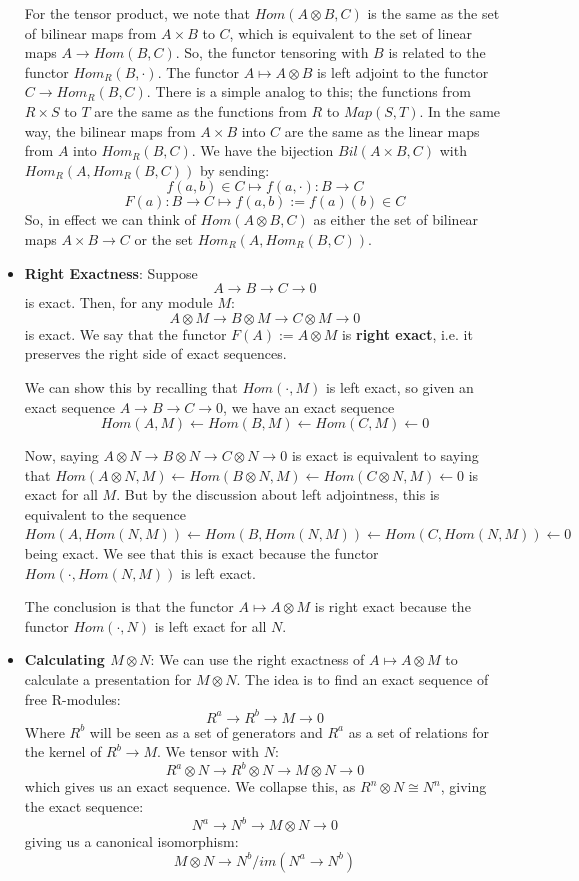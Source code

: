 \documentclass[11pt, oneside]{amsart}   	%
\theoremstyle{definition}
\begin{document}
\begin{itemize}
	For the tensor product, we note that $Hom(A\otimes B, C)$ is the same as the set of bilinear maps from $A\times B$ to $C$, which is equivalent to 
	the set of linear maps $A\rightarrow Hom(B, C)$. So, the functor tensoring with $B$ is related to the functor $Hom_R(B, \cdot)$. The functor 
	$A\mapsto A\otimes B$ is left adjoint to the functor $C\rightarrow Hom_R(B, C)$. There is a simple analog to this; the functions from $R\times S$ to 
	$T$ are the same as the functions from $R$ to $Map(S, T)$. In the same way, the bilinear maps from $A\times B$ into $C$ are the same as the linear 
	maps from $A$ into $Hom_R(B, C)$. We have the bijection $Bil(A\times B, C)$ with $Hom_R(A, Hom_R(B, C))$ by sending:
	$$
		f(a, b)\in C\mapsto f(a, \cdot) : B\rightarrow C
	$$
	$$
		F(a) : B\rightarrow C\mapsto f(a, b) := f(a)(b)\in C
	$$
	So, in effect we can think of $Hom(A\otimes B, C)$ as either the set of bilinear maps $A\times B\rightarrow C$ or the set $Hom_R(A, Hom_R(B, C))$.
	
	\item \textbf{Right Exactness}: Suppose 
	$$
		A\rightarrow B\rightarrow C\rightarrow 0
	$$
	is exact. Then, for any module $M$:
	$$
		A\otimes M\rightarrow B\otimes M\rightarrow C\otimes M\rightarrow 0 
	$$
	is exact. We say that the functor $F(A) := A\otimes M$ is \textbf{right exact}, i.e. it preserves the right side of exact sequences.
	
	We can show this by recalling that $Hom(\cdot, M)$ is left exact, so given an exact sequence $A\rightarrow B\rightarrow C\rightarrow 0$, we have an 
	exact sequence
	$$
		Hom(A, M)\leftarrow Hom(B, M)\leftarrow Hom(C, M)\leftarrow 0
	$$
	
	Now, saying $A\otimes N\rightarrow B\otimes N\rightarrow C\otimes N\rightarrow 0$ is exact is equivalent to saying that $Hom(A\otimes N, M)
	\leftarrow Hom(B\otimes N, M)\leftarrow Hom(C\otimes N, M)\leftarrow 0$ is exact for all $M$. But by the discussion about left adjointness, this 
	is equivalent to the sequence $Hom(A, Hom(N, M))\leftarrow Hom(B, Hom(N, M))\leftarrow Hom(C, Hom(N, M))\leftarrow 0$ being exact. We see 
	that this is exact because the functor $Hom(\cdot, Hom(N, M))$ is left exact.
	
	The conclusion is that the functor $A\mapsto A\otimes M$ is right exact because the functor $Hom(\cdot, N)$ is left exact for all $N$. 
	
	\item \textbf{Calculating $M\otimes N$}: We can use the right exactness of $A\mapsto A\otimes M$ to calculate a presentation for $M\otimes N$. The 
	idea is to find an exact sequence of free R-modules:
	$$
		R^a\rightarrow R^b\rightarrow M\rightarrow 0
	$$
	Where $R^b$ will be seen as a set of generators and $R^a$ as a set of relations for the kernel of $R^b\rightarrow M$. We tensor with $N$:
	$$
		R^a\otimes N\rightarrow R^b\otimes N\rightarrow M\otimes N\rightarrow 0
	$$
	which gives us an exact sequence. We collapse this, as $R^n\otimes N\cong N^n$, giving the exact sequence:
	$$
		N^a\rightarrow N^b\rightarrow M\otimes N\rightarrow 0
	$$
	giving us a canonical isomorphism:
	$$
		M\otimes N\rightarrow N^b / im(N^a\rightarrow N^b)
	$$
	

\end{itemize}
\end{document}
